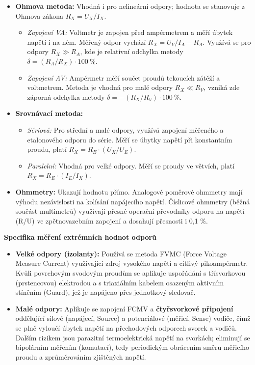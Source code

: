         \begin{itemize}
            \item \textbf{Ohmova metoda:} Vhodná i pro nelineární odpory; hodnota se stanovuje z Ohmova zákona $R_X = U_X / I_X$.
            \begin{itemize}
                \item \textit{Zapojení VA:} Voltmetr je zapojen před ampérmetrem a měří úbytek napětí i na něm. Měřený odpor vychází $R_X = U_V / I_A - R_A$. Využívá se pro odpory $R_X \gg R_A$, kde je relativní odchylka metody $\delta = (R_A / R_X) \cdot 100\ \%$.
                \item \textit{Zapojení AV:} Ampérmetr měří součet proudů tekoucích zátěží a voltmetrem. Metoda je vhodná pro malé odpory $R_X \ll R_V$, vzniká zde záporná odchylka metody $\delta = -(R_X / R_V) \cdot 100\ \%$.
            \end{itemize}
            \item \textbf{Srovnávací metoda:}
            \begin{itemize}
                \item \textit{Sériová:} Pro střední a malé odpory, využívá zapojení měřeného a etalonového odporu do série. Měří se úbytky napětí při konstantním proudu, platí $R_X = R_E \cdot (U_X / U_E)$.
                \item \textit{Paralelní:} Vhodná pro velké odpory. Měří se proudy ve větvích, platí $R_X = R_E \cdot (I_E / I_X)$.
            \end{itemize}
            \item \textbf{Ohmmetry:} Ukazují hodnotu přímo. Analogové poměrové ohmmetry mají výhodu nezávislosti na kolísání napájecího napětí. Číslicové ohmmetry (běžná součást multimetrů) využívají přesné operační převodníky odporu na napětí (R/U) ve zpětnovazebním zapojení a dosahují přesnosti i 0,1 \%.
        \end{itemize}
        
        \textbf{Specifika měření extrémních hodnot odporů}
        
        \begin{itemize}
            \item \textbf{Velké odpory (izolanty):} Používá se metoda FVMC (Force Voltage Measure Current) využívající zdroj vysokého napětí a citlivý pikoampérmetr. Kvůli povrchovým svodovým proudům se aplikuje uspořádání s třísvorkovou (prstencovou) elektrodou a s triaxiálním kabelem osazeným aktivním stíněním (Guard), jež je napájeno přes jednotkový sledovač.
            \item \textbf{Malé odpory:} Aplikuje se zapojení FCMV a \textbf{čtyřsvorkové připojení} oddělující silové (napájecí, Source) a potenciálové (měřicí, Sense) vodiče, čímž se plně vyloučí úbytek napětí na přechodových odporech svorek a vodičů. Dalším rizikem jsou parazitní termoelektrická napětí na svorkách; eliminují se bipolárním měřením (komutací), tedy periodickým obrácením směru měřicího proudu a zprůměrováním zjištěných napětí.
        \end{itemize}
        
